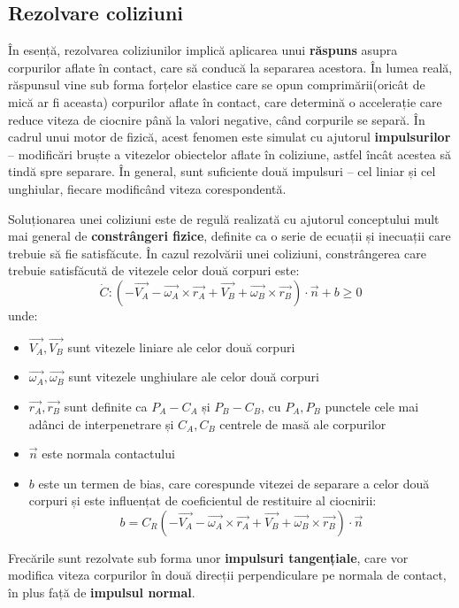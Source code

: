 \documentclass[12pt,a4paper]{report}
\begin{document}
\subsection{Rezolvare coliziuni}
În esență, rezolvarea coliziunilor implică aplicarea unui \textbf{răspuns} asupra corpurilor aflate în contact, care să conducă la separarea acestora. În lumea reală, răspunsul vine sub forma forțelor elastice care se opun comprimării(oricât de mică ar fi aceasta) corpurilor aflate în contact, care determină o accelerație care reduce viteza de ciocnire până la valori negative, când corpurile se separă. În cadrul unui motor de fizică, acest fenomen este simulat cu ajutorul \textbf{impulsurilor} -- modificări bruște a vitezelor obiectelor aflate în coliziune, astfel încât acestea să tindă spre separare. În general, sunt suficiente două impulsuri -- cel liniar și cel unghiular, fiecare modificând viteza corespondentă.

Soluționarea unei coliziuni este de regulă realizată cu ajutorul conceptului mult mai general de \textbf{constrângeri fizice}, definite ca o serie de ecuații și inecuații care trebuie să fie satisfăcute. În cazul rezolvării unei coliziuni, constrângerea care trebuie satisfăcută de vitezele celor două corpuri este:
$$ \dot{C} \colon \left( -\vec{V_A} - \vec{\omega_A} \times \vec{r_A} + \vec{V_B} + \vec{\omega_B} \times \vec{r_B} \right) \cdot \vec{n} + b\geq 0 $$unde:
\begin{itemize}
	\item $\vec{V_A}, \vec{V_B}$ sunt vitezele liniare ale celor două corpuri
	\item $\vec{\omega_A}, \vec{\omega_B}$ sunt vitezele unghiulare ale celor două corpuri
	\item $\vec{r_A}, \vec{r_B}$ sunt definite ca $P_A - C_A$ și $P_B - C_B$, cu $P_A,P_B$ punctele cele mai adânci de interpenetrare și $C_A, C_B$ centrele de masă ale corpurilor
	\item $\vec{n}$ este normala contactului
	\item $b$ este un termen de bias, care corespunde vitezei de separare a celor două corpuri și este influențat de coeficientul de restituire al ciocnirii: $$b = C_R\left( -\vec{V_A} - \vec{\omega_A} \times \vec{r_A} + \vec{V_B} + \vec{\omega_B} \times \vec{r_B} \right) \cdot \vec{n} $$
\end{itemize}

Frecările sunt rezolvate sub forma unor \textbf{impulsuri tangențiale}, care vor modifica viteza corpurilor în două direcții perpendiculare pe normala de contact, în plus față de \textbf{impulsul normal}.
\end{document}
